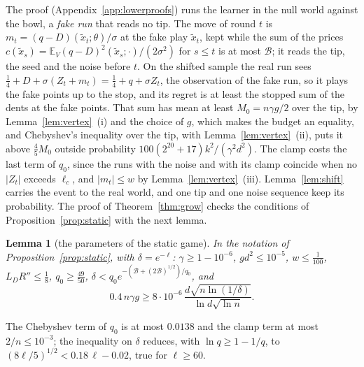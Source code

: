 \documentclass[11pt]{amsart}
\newtheorem{lemma}[theorem]{Lemma}
\theoremstyle{definition}
\numberwithin{equation}{section}
\newcommand{\E}{\mathbb{E}}
\begin{document}
The proof (Appendix~\ref{app:lowerproofs}) runs the learner in the null world against the bowl, a \emph{fake run} that reads no tip. The move of round $t$ is $m_t=(q-D)(\tilde x_t;\theta)/\sigma$ at the fake play $\tilde x_t$, kept while the sum of the prices $c(\tilde x_s)=\E_V(q-D)^2(\tilde x_s;\cdot)/(2\sigma^2)$ for $s\le t$ is at most $\mathcal B$; it reads the tip, the seed and the noise before $t$. On the shifted sample the real run sees $\frac14+D+\sigma(Z_t+m_t)=\frac14+q+\sigma Z_t$, the observation of the fake run, so it plays the fake points up to the stop, and its regret is at least the stopped sum of the dents at the fake points. That sum has mean at least $M_0=n\gamma g/2$ over the tip, by Lemma~\ref{lem:vertex}~(i) and the choice of $g$, which makes the budget an equality, and Chebyshev's inequality over the tip, with Lemma~\ref{lem:vertex}~(ii), puts it above $\frac45M_0$ outside probability $100(2^{20}+17)k^2/(\gamma^2d^2)$. The clamp costs the last term of $q_0$, since the runs with the noise and with its clamp coincide when no $|Z_t|$ exceeds $\ell_c$, and $|m_t|\le w$ by Lemma~\ref{lem:vertex}~(iii). Lemma~\ref{lem:shift} carries the event to the real world, and one tip and one noise sequence keep its probability.
The proof of Theorem~\ref{thm:grow} checks the conditions of Proposition~\ref{prop:static} with the next lemma.

\begin{lemma}[the parameters of the static game]\label{lem:growpar}
In the notation of Proposition~\ref{prop:static}, with $\delta=e^{-\ell}$: $\gamma\ge1-10^{-6}$, $gd^2\le10^{-5}$, $w\le\frac1{100}$, $L_DR''\le\frac18$, $q_0\ge\frac{49}{50}$, $\delta<q_0e^{-(\mathcal B+(2\mathcal B)^{1/2})/q_0}$, and
\[
0.4\,n\gamma g\ge8\cdot10^{-6}\,\frac{d\sqrt{n\ln(1/\delta)}}{\ln d\sqrt{\ln n}} .
\]
\end{lemma}

The Chebyshev term of $q_0$ is at most $0.0138$ and the clamp term at most $2/n\le10^{-3}$; the inequality on $\delta$ reduces, with $\ln q\ge1-1/q$, to $(8\ell/5)^{1/2}<0.18\,\ell-0.02$, true for $\ell\ge60$.
\end{document}
